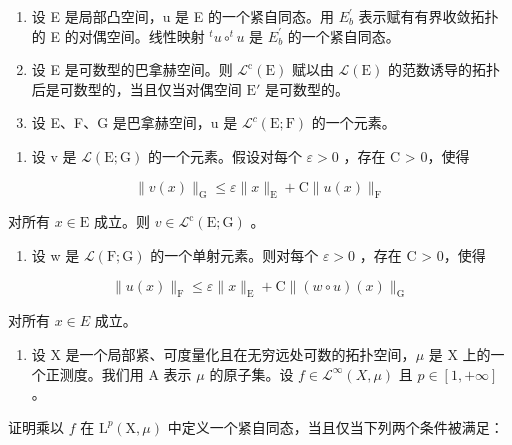 \begin{enumerate}
\def\labelenumi{\arabic{enumi})}
\setcounter{enumi}{15}
\item
  设 E 是局部凸空间，u 是 E 的一个紧自同态。用 \(E_{b}^{\prime}\) 表示赋有有界收敛拓扑的 E 的对偶空间。线性映射 \(^{t}u \circ ^{t}u\) 是 \(E_{b}^{\prime}\) 的一个紧自同态。
\item
  设 E 是可数型的巴拿赫空间。则 \(\mathcal{L}^{\mathrm{c}}(\mathrm{E})\) 赋以由 \(\mathcal{L}(\mathrm{E})\) 的范数诱导的拓扑后是可数型的，当且仅当对偶空间 \(\mathrm{E}'\) 是可数型的。
\item
  设 E、F、G 是巴拿赫空间，u 是 \(\mathcal{L}^{c}(\mathrm{E};\mathrm{F})\) 的一个元素。
\end{enumerate}

\begin{enumerate}
\def\labelenumi{\alph{enumi})}
\tightlist
\item
  设 v 是 \(\mathcal{L}(\mathrm{E};\mathrm{G})\) 的一个元素。假设对每个 \(\varepsilon > 0\) ，存在 C \textgreater{} 0，使得
\end{enumerate}

\[
\| v (x) \| _ {\mathrm{G}} \leqslant \varepsilon \| x \| _ {\mathrm{E}} + \mathrm{C} \| u (x) \| _ {\mathrm{F}}
\]

对所有 \(x\in \mathrm{E}\) 成立。则 \(v\in \mathcal{L}^{\mathrm{c}}(\mathrm{E};\mathrm{G})\) 。

\begin{enumerate}
\def\labelenumi{\alph{enumi})}
\setcounter{enumi}{1}
\tightlist
\item
  设 w 是 \(\mathcal{L}(\mathrm{F};\mathrm{G})\) 的一个单射元素。则对每个 \(\varepsilon > 0\) ，存在 C \textgreater{} 0，使得
\end{enumerate}

\[
\| u (x) \| _ {\mathrm{F}} \leqslant \varepsilon \| x \| _ {\mathrm{E}} + \mathrm{C} \| (w \circ u) (x) \| _ {\mathrm{G}}
\]

对所有 \(x \in E\) 成立。

\begin{enumerate}
\def\labelenumi{\arabic{enumi})}
\setcounter{enumi}{18}
\tightlist
\item
  设 X 是一个局部紧、可度量化且在无穷远处可数的拓扑空间，\(\mu\) 是 X 上的一个正测度。我们用 A 表示 \(\mu\) 的原子集。设 \(f \in \mathcal{L}^{\infty}(X, \mu)\) 且 \(p \in [1, +\infty]\) 。
\end{enumerate}

证明乘以 \(f\) 在 \(\mathrm{L}^{p}(\mathrm{X},\mu)\) 中定义一个紧自同态，当且仅当下列两个条件被满足：

